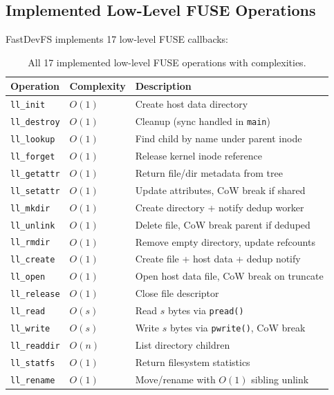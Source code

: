 \documentclass[12pt, a4paper]{article}
\begin{document}
\subsection{Implemented Low-Level FUSE Operations}

FastDevFS implements 17 low-level FUSE callbacks:

\begin{table}[H]
\centering
\small
\begin{tabular}{llp{6cm}}
\toprule
\textbf{Operation} & \textbf{Complexity} & \textbf{Description} \\
\midrule
\texttt{ll\_init} & $O(1)$ & Create host data directory \\
\texttt{ll\_destroy} & $O(1)$ & Cleanup (sync handled in \texttt{main}) \\
\texttt{ll\_lookup} & $O(1)$ & Find child by name under parent inode \\
\texttt{ll\_forget} & $O(1)$ & Release kernel inode reference \\
\texttt{ll\_getattr} & $O(1)$ & Return file/dir metadata from tree \\
\texttt{ll\_setattr} & $O(1)$ & Update attributes, CoW break if shared \\
\texttt{ll\_mkdir} & $O(1)$ & Create directory + notify dedup worker \\
\texttt{ll\_unlink} & $O(1)$ & Delete file, CoW break parent if deduped \\
\texttt{ll\_rmdir} & $O(1)$ & Remove empty directory, update refcounts \\
\texttt{ll\_create} & $O(1)$ & Create file + host data + dedup notify \\
\texttt{ll\_open} & $O(1)$ & Open host data file, CoW break on truncate \\
\texttt{ll\_release} & $O(1)$ & Close file descriptor \\
\texttt{ll\_read} & $O(s)$ & Read $s$ bytes via \texttt{pread()} \\
\texttt{ll\_write} & $O(s)$ & Write $s$ bytes via \texttt{pwrite()}, CoW break \\
\texttt{ll\_readdir} & $O(n)$ & List directory children \\
\texttt{ll\_statfs} & $O(1)$ & Return filesystem statistics \\
\texttt{ll\_rename} & $O(1)$ & Move/rename with $O(1)$ sibling unlink \\
\bottomrule
\end{tabular}
\caption{All 17 implemented low-level FUSE operations with complexities.}
\end{table}
\end{document}

